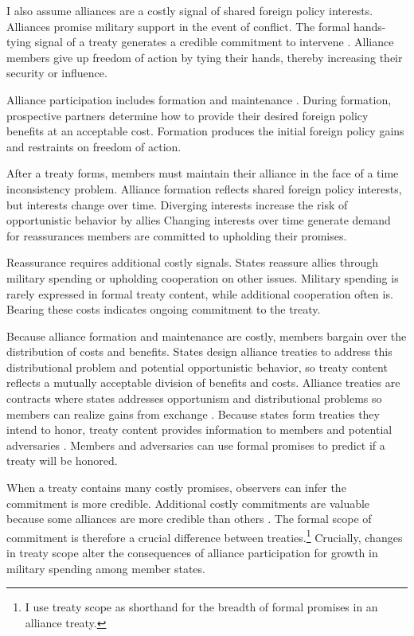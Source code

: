 \documentclass[12pt]{article}
\begin{document}
I also assume alliances are a costly signal of shared foreign policy interests. 
Alliances promise military support in the event of conflict. 
The formal hands-tying signal of a treaty generates a credible commitment to intervene \citep{Fearon1997, Leeds2003}.
Alliance members give up freedom of action by tying their hands, thereby increasing their security or influence. 


Alliance participation includes formation and maintenance \citep{Snyder1997}. 
During formation, prospective partners determine how to provide their desired foreign policy benefits at an acceptable cost. 
Formation produces the initial foreign policy gains and restraints on freedom of action. 


After a treaty forms, members must maintain their alliance in the face of a time inconsistency problem. 
Alliance formation reflects shared foreign policy interests, but interests change over time. 
Diverging interests increase the risk of opportunistic behavior by allies \citep{Leeds2003a, LeedsSavun2007}
Changing interests over time generate demand for reassurances members are committed to upholding their promises. 


Reassurance requires additional costly signals. 
States reassure allies through military spending or upholding cooperation on other issues.
Military spending is rarely expressed in formal treaty content, while additional cooperation often is. 
Bearing these costs indicates ongoing commitment to the treaty. 


Because alliance formation and maintenance are costly, members bargain over the distribution of costs and benefits.
States design alliance treaties to address this distributional problem and potential opportunistic behavior, so treaty content reflects a mutually acceptable division of benefits and costs. 
Alliance treaties are contracts where states addresses opportunism and distributional problems \citep{Williamson1985, Koremenosetal2001} so members can realize gains from exchange \citep{Lake1996, Bensonetal2014}.
Because states form treaties they intend to honor, treaty content provides information to members and potential adversaries \citep{Leeds2003}. 
Members and adversaries can use formal promises to predict if a treaty will be honored.


When a treaty contains many costly promises, observers can infer the commitment is more credible. 
Additional costly commitments are valuable because some alliances are more credible than others \citep{Benson2012}. 
The formal scope of commitment is therefore a crucial difference between treaties.\footnote{I use treaty scope as shorthand for the breadth of formal promises in an alliance treaty.} 
Crucially, changes in treaty scope alter the consequences of alliance participation for growth in military spending among member states. 
\end{document}
